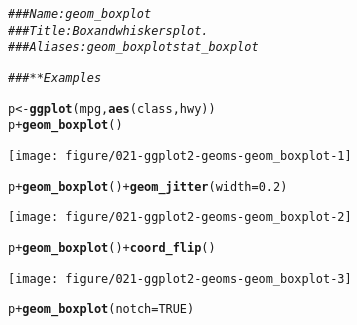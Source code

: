 \documentclass[a4paper,titlepage]{tufte-handout}\usepackage[]{graphicx}\usepackage[]{color}
\makeatletter
\def\maxwidth{ %
  \ifdim\Gin@nat@width>\linewidth
    \linewidth
  \else
    \Gin@nat@width
  \fi
}
\newcommand{\hlnum}[1]{\textcolor[rgb]{0.686,0.059,0.569}{#1}}%
\newcommand{\hlcom}[1]{\textcolor[rgb]{0.678,0.584,0.686}{\textit{#1}}}%
\newcommand{\hlopt}[1]{\textcolor[rgb]{0,0,0}{#1}}%
\newcommand{\hlstd}[1]{\textcolor[rgb]{0.345,0.345,0.345}{#1}}%
\newcommand{\hlkwb}[1]{\textcolor[rgb]{0.69,0.353,0.396}{#1}}%
\newcommand{\hlkwc}[1]{\textcolor[rgb]{0.333,0.667,0.333}{#1}}%
\newcommand{\hlkwd}[1]{\textcolor[rgb]{0.737,0.353,0.396}{\textbf{#1}}}%
\newenvironment{kframe}{%
 \def\at@end@of@kframe{}%
 \ifinner\ifhmode%
  \def\at@end@of@kframe{\end{minipage}}%
  \begin{minipage}{\columnwidth}%
 \fi\fi%
 \def\FrameCommand##1{\hskip\@totalleftmargin \hskip-\fboxsep
 \colorbox{shadecolor}{##1}\hskip-\fboxsep
     \hskip-\linewidth \hskip-\@totalleftmargin \hskip\columnwidth}%
 \MakeFramed {\advance\hsize-\width
   \@totalleftmargin\z@ \linewidth\hsize
   \@setminipage}}%
 {\par\unskip\endMakeFramed%
 \at@end@of@kframe}
\newenvironment{knitrout}{}{} %
\makeatother
\begin{document}
\begin{knitrout}
\color{fgcolor}\begin{kframe}
\begin{alltt}
\hlcom{### Name: geom_boxplot}
\hlcom{### Title: Box and whiskers plot.}
\hlcom{### Aliases: geom_boxplot stat_boxplot}

\hlcom{### ** Examples}

\hlstd{p} \hlkwb{<-} \hlkwd{ggplot}\hlstd{(mpg,} \hlkwd{aes}\hlstd{(class, hwy))}
\hlstd{p} \hlopt{+} \hlkwd{geom_boxplot}\hlstd{()}
\end{alltt}
\end{kframe}
\texttt{[image: figure/021-ggplot2-geoms-geom\_boxplot-1]} 
\begin{kframe}\begin{alltt}
\hlstd{p} \hlopt{+} \hlkwd{geom_boxplot}\hlstd{()} \hlopt{+} \hlkwd{geom_jitter}\hlstd{(}\hlkwc{width} \hlstd{=} \hlnum{0.2}\hlstd{)}
\end{alltt}
\end{kframe}
\texttt{[image: figure/021-ggplot2-geoms-geom\_boxplot-2]} 
\begin{kframe}\begin{alltt}
\hlstd{p} \hlopt{+} \hlkwd{geom_boxplot}\hlstd{()} \hlopt{+} \hlkwd{coord_flip}\hlstd{()}
\end{alltt}
\end{kframe}
\texttt{[image: figure/021-ggplot2-geoms-geom\_boxplot-3]} 
\begin{kframe}\begin{alltt}
\hlstd{p} \hlopt{+} \hlkwd{geom_boxplot}\hlstd{(}\hlkwc{notch} \hlstd{=} \hlnum{TRUE}\hlstd{)}
\end{alltt}



\end{kframe}
\end{knitrout}
\end{document}
